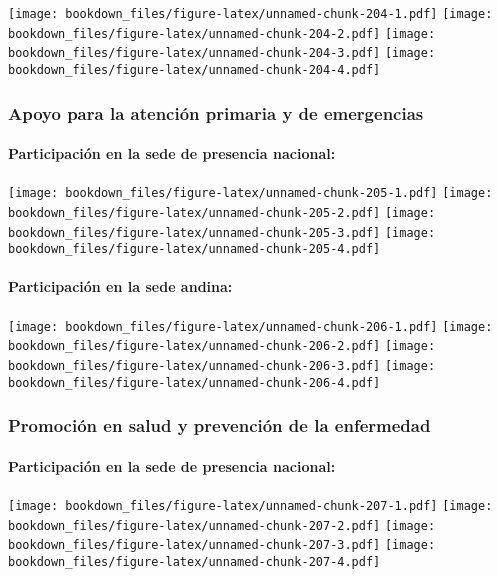 \documentclass[]{article}
\let\oldparagraph\paragraph
\renewcommand{\paragraph}[1]{\oldparagraph{#1}\mbox{}}
\theoremstyle{definition}
\theoremstyle{definition}
\theoremstyle{definition}
\theoremstyle{remark}
\begin{document}
\texttt{[image: bookdown\_files/figure-latex/unnamed-chunk-204-1.pdf]}
\texttt{[image: bookdown\_files/figure-latex/unnamed-chunk-204-2.pdf]}
\texttt{[image: bookdown\_files/figure-latex/unnamed-chunk-204-3.pdf]}
\texttt{[image: bookdown\_files/figure-latex/unnamed-chunk-204-4.pdf]}

\subsubsection{Apoyo para la atención primaria y de
emergencias}\label{apoyo-para-la-atencion-primaria-y-de-emergencias-1}

\paragraph{Participación en la sede de presencia
nacional:}\label{participacion-en-la-sede-de-presencia-nacional-19}

\texttt{[image: bookdown\_files/figure-latex/unnamed-chunk-205-1.pdf]}
\texttt{[image: bookdown\_files/figure-latex/unnamed-chunk-205-2.pdf]}
\texttt{[image: bookdown\_files/figure-latex/unnamed-chunk-205-3.pdf]}
\texttt{[image: bookdown\_files/figure-latex/unnamed-chunk-205-4.pdf]}

\paragraph{Participación en la sede
andina:}\label{participacion-en-la-sede-andina-19}

\texttt{[image: bookdown\_files/figure-latex/unnamed-chunk-206-1.pdf]}
\texttt{[image: bookdown\_files/figure-latex/unnamed-chunk-206-2.pdf]}
\texttt{[image: bookdown\_files/figure-latex/unnamed-chunk-206-3.pdf]}
\texttt{[image: bookdown\_files/figure-latex/unnamed-chunk-206-4.pdf]}

\subsubsection{Promoción en salud y prevención de la
enfermedad}\label{promocion-en-salud-y-prevencion-de-la-enfermedad}

\paragraph{Participación en la sede de presencia
nacional:}\label{participacion-en-la-sede-de-presencia-nacional-20}

\texttt{[image: bookdown\_files/figure-latex/unnamed-chunk-207-1.pdf]}
\texttt{[image: bookdown\_files/figure-latex/unnamed-chunk-207-2.pdf]}
\texttt{[image: bookdown\_files/figure-latex/unnamed-chunk-207-3.pdf]}
\texttt{[image: bookdown\_files/figure-latex/unnamed-chunk-207-4.pdf]}
\end{document}
